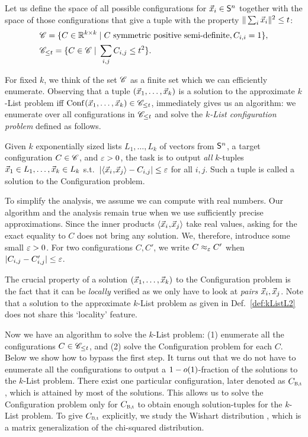 Let us define the space of all possible configurations for $\vec x_i \in \mathsf{S}^{n}$ together with the space of those configurations that give a tuple with the property $\| \sum_i \vec x_i \|^2 \leq t$:
\begin{align*}
	&\mathscr{C} = \{ C \in {{\mathbb R}}^{k \times k} \; |  \; C \text{ symmetric positive semi-definite}, C_{i,i}=1 \}, \\
	&\mathscr{C}_{\leq t} = \{ C \in \mathscr{C} \; | \; \sum_{i,j} C_{i,j} \leq t^2 \}.
\end{align*}

For fixed $k$, we think of the set $\mathscr{C}$ as a finite set which we can efficiently enumerate.  
Observing that a tuple $(\vec x_1, \ldots, \vec x_k)$ is a solution to the approximate $k$-List problem iff $\text{Conf}\mkern2mu(\vec x_1, \ldots, \vec x_k) \in \mathscr{C}_{\leq t}$, immediately gives us an algorithm: we enumerate over all configurations in $\mathscr{C}_{\leq t}$ and solve the \emph{$k$-List configuration problem} defined as follows.

\begin{definition} \label{def:ConfigProblem}
Given $k$ exponentially sized lists $L_1, \ldots, L_k$ of vectors from $\mathsf{S}^{n}$, a target configuration $C \in \mathscr{C}$, and $\varepsilon>0$, the task is to output \emph{all} $k$-tuples $\vec x_1 \in L_1, \ldots, \vec x_k \in L_k$ s.t.\ $| \langle\vec x_i\!\mathbin{,}\!\vec x_j\rangle - C_{i,j}| \leq \varepsilon$ for all $i, j$. Such a tuple is called a solution to the Configuration problem.
\end{definition}

\begin{remark}
To simplify the analysis, we assume we can compute with real numbers. Our algorithm and the analysis remain true when we use sufficiently precise approximations. Since the inner products $\langle\vec x_i\!\mathbin{,}\!\vec x_j\rangle$ take real values, asking for the exact equality to $C$ does not bring any solution. We, therefore, introduce some small $\varepsilon > 0$. For two configurations $C, C'$, we write $C \approx_{\varepsilon} C'$ when $| C_{i,j} - C'_{i,j} | \leq \varepsilon$. 
\end{remark}

The crucial property of a solution $(\vec x_1, \ldots, \vec x_k)$ to the Configuration problem is the fact that it can be \emph{locally} verified as we only have to look at \emph{pairs} $\vec x_i, \vec x_j$. Note that a solution to the approximate $k$-List problem as given in Def.~\ref{def:kListL2} does not share this `locality' feature. 

Now we have an algorithm to solve the $k$-List problem: (1) enumerate all the configurations $C \in \mathscr{C}_{\leq t}$, and (2) solve the Configuration problem for each $C$. Below we show how to bypass the first step. It turns out that we do not have to enumerate all the configurations to output a $1-o(1)$-fraction of the solutions to the $k$-List problem. There exist one particular configuration, later denoted as $\Cbalt$, which is attained by most of the solutions. This allows us to solve the Configuration problem only for $\Cbalt$ to obtain enough solution-tuples for the $k$-List problem. To give $\Cbalt$ explicitly, we study the Wishart distribution \cite{Wishart28}, which is a matrix generalization of the chi-squared distribution.

